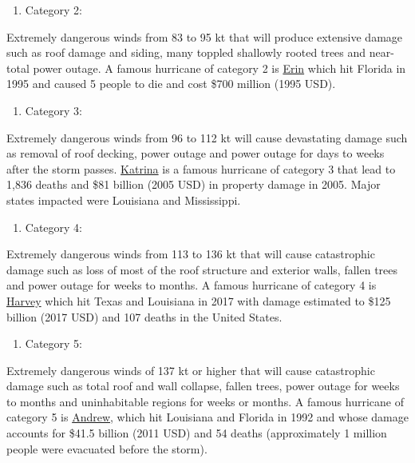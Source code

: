 \documentclass[]{book}
\providecommand{\tightlist}{%
  \setlength{\itemsep}{0pt}\setlength{\parskip}{0pt}}
\begin{document}
\begin{enumerate}
\def\labelenumi{(\arabic{enumi})}
\setcounter{enumi}{1}
\tightlist
\item
  Category 2:
\end{enumerate}

Extremely dangerous winds from 83 to 95 kt that will produce extensive damage such as roof damage and siding, many toppled shallowly rooted trees and near-total power outage. A famous hurricane of category 2 is \href{https://en.wikipedia.org/wiki/Hurricane_Erin_(1995)}{Erin} which hit Florida in 1995 and caused 5 people to die and cost \$700 million (1995 USD).

\begin{enumerate}
\def\labelenumi{(\arabic{enumi})}
\setcounter{enumi}{2}
\tightlist
\item
  Category 3:
\end{enumerate}

Extremely dangerous winds from 96 to 112 kt will cause devastating damage such as removal of roof decking, power outage and power outage for days to weeks after the storm passes. \href{https://en.wikipedia.org/wiki/Hurricane_Katrina}{Katrina} is a famous hurricane of category 3 that lead to 1,836 deaths and \$81 billion (2005 USD) in property damage in 2005. Major states impacted were Louisiana and Mississippi.

\begin{enumerate}
\def\labelenumi{(\arabic{enumi})}
\setcounter{enumi}{3}
\tightlist
\item
  Category 4:
\end{enumerate}

Extremely dangerous winds from 113 to 136 kt that will cause catastrophic damage such as loss of most of the roof structure and exterior walls, fallen trees and power outage for weeks to months. A famous hurricane of category 4 is \href{https://en.wikipedia.org/wiki/Hurricane_Harvey}{Harvey} which hit Texas and Louisiana in 2017 with damage estimated to \$125 billion (2017 USD) and 107 deaths in the United States.

\begin{enumerate}
\def\labelenumi{(\arabic{enumi})}
\setcounter{enumi}{4}
\tightlist
\item
  Category 5:
\end{enumerate}

Extremely dangerous winds of 137 kt or higher that will cause catastrophic damage such as total roof and wall collapse, fallen trees, power outage for weeks to months and uninhabitable regions for weeks or months. A famous hurricane of category 5 is \href{https://en.wikipedia.org/wiki/Hurricane_Andrew}{Andrew}, which hit Louisiana and Florida in 1992 and whose damage accounts for \$41.5 billion (2011 USD) and 54 deaths (approximately 1 million people were evacuated before the storm).
\end{document}
